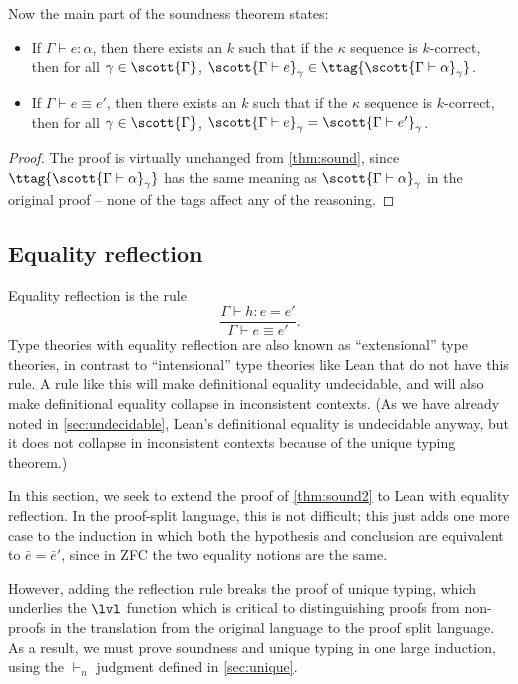 Now the main part of the soundness theorem states:
\begin{theorem}[Soundness]\label{thm:sound2}
\begin{itemize}
\item If $\Gamma\vdash e:\alpha$, then there exists an $k$ such that if the $\kappa$ sequence is $k$-correct, then for all $\gamma\in\scott{\Gamma}$, $\scott{\Gamma\vdash e}_\gamma\in \ttag{\scott{\Gamma\vdash \alpha}_\gamma}$.
\item If $\Gamma\vdash e\equiv e'$, then there exists an $k$ such that if the $\kappa$ sequence is $k$-correct, then for all $\gamma\in\scott{\Gamma}$, $\scott{\Gamma\vdash e}_\gamma=\scott{\Gamma\vdash e'}_\gamma$.
\end{itemize}
\end{theorem}
\begin{proof}
The proof is virtually unchanged from \autoref{thm:sound}, since $\ttag{\scott{\Gamma\vdash \alpha}_\gamma}$ has the same meaning as $\scott{\Gamma\vdash \alpha}_\gamma$ in the original proof -- none of the tags affect any of the reasoning.
\end{proof}

\subsection{Equality reflection}
Equality reflection is the rule
$$\frac{\Gamma\vdash h:e=e'}{\Gamma\vdash e\equiv e'}.$$
Type theories with equality reflection are also known as ``extensional'' type theories, in contrast to ``intensional'' type theories like Lean that do not have this rule. A rule like this will make definitional equality undecidable, and will also make definitional equality collapse in inconsistent contexts. (As we have already noted in \autoref{sec:undecidable}, Lean's definitional equality is undecidable anyway, but it does not collapse in inconsistent contexts because of the unique typing theorem.)

In this section, we seek to extend the proof of \autoref{thm:sound2} to Lean with equality reflection. In the proof-split language, this is not difficult; this just adds one more case to the induction in which both the hypothesis and conclusion are equivalent to $\bar e=\bar e'$, since in ZFC the two equality notions are the same.

However, adding the reflection rule breaks the proof of unique typing, which underlies the $\lvl$ function which is critical to distinguishing proofs from non-proofs in the translation from the original language to the proof split language. As a result, we must prove soundness and unique typing in one large induction, using the $\vdash_n$ judgment defined in \autoref{sec:unique}.

